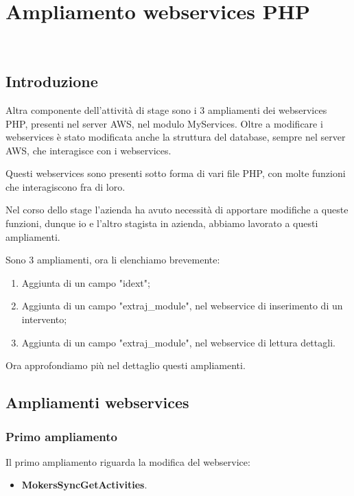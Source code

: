 
\chapter{Ampliamento webservices PHP}
\label{cap:webservices}

\\

\section{Introduzione}
Altra componente dell'attività di stage sono i 3 ampliamenti dei webservices PHP, presenti nel server AWS, nel modulo MyServices. Oltre a modificare i webservices è stato modificata anche la struttura del database, sempre nel server AWS, che interagisce con i webservices.

Questi webservices sono presenti sotto forma di vari file PHP, con molte funzioni che interagiscono fra di loro.

Nel corso dello stage l'azienda ha avuto necessità di apportare modifiche a queste funzioni, dunque io e l'altro stagista in azienda, abbiamo lavorato a questi ampliamenti.

Sono 3 ampliamenti, ora li elenchiamo brevemente:
\begin{enumerate}
	\item Aggiunta di un campo "idext";
	\item Aggiunta di un campo "extraj\_module", nel webservice di inserimento di un intervento;
	\item Aggiunta di un campo "extraj\_module", nel webservice di lettura dettagli.
\end{enumerate}

Ora approfondiamo più nel dettaglio questi ampliamenti.

\newpage

\section{Ampliamenti webservices}
\subsection{Primo ampliamento}
Il primo ampliamento riguarda la modifica del webservice:
\begin{itemize}
	\item \textbf{MokersSyncGetActivities}.
\end{itemize}

